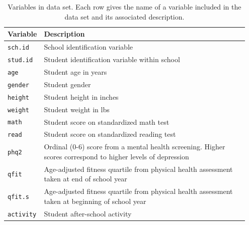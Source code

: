 \begin{table}[t!]
	\footnotesize
	\centering
	\renewcommand{\arraystretch}{1.25}
	\begin{tabular}{p{0.1\linewidth} p{0.85\linewidth}}
		\textbf{Variable} 		 & \textbf{Description}	\\
		\hline 
		\texttt{sch.id}	   & School identification variable	 \\
		\texttt{stud.id}	   & Student identification variable within school	 \\
		\texttt{age}	   & Student age in years	 \\
		\texttt{gender}	   & Student gender \\
		\texttt{height}	   & Student height in inches \\
		\texttt{weight}	   & Student weight in lbs \\
		\texttt{math}	   & Student score on standardized math test \\
		\texttt{read}	   & Student score on standardized reading test \\
		\texttt{phq2}	   & Ordinal (0-6) score from a mental health screening. Higher scores correspond to higher levels of depression \\
		\texttt{qfit}	   & Age-adjusted fitness quartile from physical health assessment taken at end of school year \\
		\texttt{qfit.s}	   & Age-adjusted fitness quartile from physical health assessment taken at beginning of school year \\
		\texttt{activity}  & Student after-school activity \\
		\hline																		
	\end{tabular}
	\caption{\label{t:screen8} Variables in  data set. Each row gives the name of a variable included in the  data set and its associated description.}
\end{table}
\pagebreak

